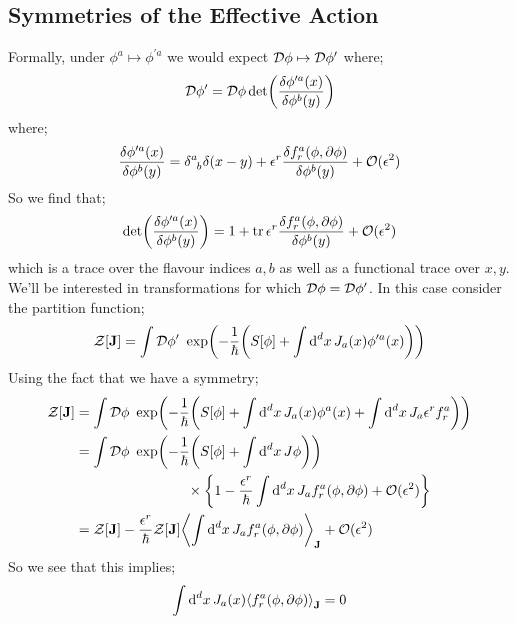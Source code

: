 \subsection{Symmetries of the Effective Action}
Formally, under $\phi^a \mapsto \phi^{\prime a}$ we would expect $\mathcal{D} \phi \mapsto \mathcal{D} \phi^{\prime}$ where;
\begin{equation*}
\mD \phi\pr = \mD \phi \det\left(\frac{\delta \phi^{\prime a}(x)}{\delta \phi^b(y)}\right)
\end{equation*} 
where;
\begin{equation*}
\frac{\delta \phi^{\prime a}(x)}{\delta \phi^b(y)} = \delta\indices{^{a}_{b}}\delta(x - y) + \epsilon^{r}\frac{\delta f_r^a(\phi, \del \phi)}{\delta \phi^b(y)} + \mO(\epsilon^2)
\end{equation*}
So we find that;
\begin{equation*}
\det\left(\frac{\delta \phi^{\prime a}(x)}{\delta \phi^b(y)}\right) = 1 + \tr \epsilon^r \frac{\delta f_r^a(\phi, \del \phi)}{\delta \phi^b(y)} + \mO(\epsilon^2)
\end{equation*}
which is a trace over the flavour indices $a, b$ as well as a functional trace over $x, y$. We'll be interested in transformations for which $\mathcal{D} \phi = \mathcal{D} \phi^{\prime}$. In this case consider the partition function;
\begin{equation*}
\mZ[\vec{J}] = \int{\mD \phi\pr \,\,\exp\left(-\frac{1}{\hbar}\left(S[\phi] + \int{\upd{^d x}J_a(x)\phi^{\prime a}(x)}\right)\right)}
\end{equation*}
Using the fact that we have a symmetry;
\begin{align*}
\mZ[\vec{J}] &= \int{\mD \phi \,\,\exp\left(-\frac{1}{\hbar}\left(S[\phi] + \int{\upd{^d x}J_a(x)\phi^a(x)} + \int{\upd{^d x}J_a \epsilon^r f^a_r}\right)\right)} \\
&= \int{\mD \phi \,\, \exp\left(- \frac{1}{\hbar}\left(S[\phi] + \int{\upd{^d x}J\phi}\right)\right)} \\ 
&\qquad \qquad \qquad \qquad \times \left\{1 - \frac{\epsilon^r}{\hbar}\int{\upd{^d x}J_a f_r^a(\phi, \del \phi)} + \mO(\epsilon^2)\right\} \\
&= \mZ[\vec{J}] - \frac{\epsilon^r}{\hbar}\mZ[\vec{J}] \left< \int{\upd{^d x}J_a f^a_r(\phi, \del\phi)} \right>_{\vec{J}} + \mO(\epsilon^2)
\end{align*}
So we see that this implies;
\begin{equation}
\int{\upd{^d x}J_a(x)\left< f^a_r(\phi, \del \phi) \right>_{\vec{J}}} = 0
\end{equation}
